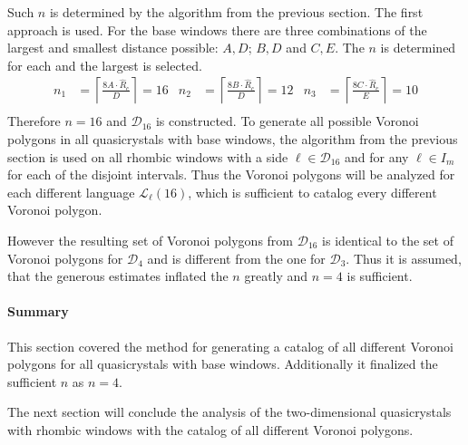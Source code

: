 \documentclass[text.tex]{subfiles}
\begin{document}
Such $n$ is determined by the algorithm from the previous section. The first approach is used. For the base windows there are three combinations of the largest and smallest distance possible: $A,D$; $B,D$ and $C,E$. The $n$ is determined for each and the largest is selected. 
\begin{align*}
n_1 &= \left\lceil\frac{8A\cdot\hat{R}_c}{D}\right\rceil = 16 & n_2 &= \left\lceil\frac{8B\cdot\hat{R}_c}{D}\right\rceil = 12 & n_3 &= \left\lceil\frac{8C\cdot\hat{R}_c}{E}\right\rceil = 10\\
\end{align*}
Therefore $n=16$ and $\mathcal{D}_{16}$ is constructed. To generate all possible Voronoi polygons in all quasicrystals with base windows, the algorithm from the previous section is used on all rhombic windows with a side $\ell\in\mathcal{D}_{16}$ and for any $\ell\in I_m$ for each of the disjoint intervals. Thus the Voronoi polygons will be analyzed for each different language $\mathcal{L}_\ell(16)$, which is sufficient to catalog every different Voronoi polygon. 

However the resulting set of Voronoi polygons from $\mathcal{D}_{16}$ is identical to the set of Voronoi polygons for $\mathcal{D}_4$ and is different from the one for $\mathcal{D}_3$. Thus it is assumed, that the generous estimates inflated the $n$ greatly and $n=4$ is sufficient.

\paragraph{Summary} This section covered the method for generating a catalog of all different Voronoi polygons for all quasicrystals with base windows. Additionally it finalized the sufficient $n$ as $n=4$.

The next section will conclude the analysis of the two-dimensional quasicrystals with rhombic windows with the catalog of all different Voronoi polygons.

\clearpage
\end{document}
